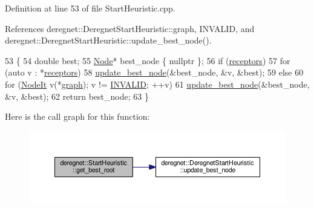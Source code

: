 Definition at line 53 of file Start\+Heuristic.\+cpp.



References deregnet\+::\+Deregnet\+Start\+Heuristic\+::graph, I\+N\+V\+A\+L\+ID, and deregnet\+::\+Deregnet\+Start\+Heuristic\+::update\+\_\+best\+\_\+node().


\begin{DoxyCode}
53                                     \{
54     \textcolor{keywordtype}{double} best;
55     \hyperlink{namespacederegnet_a744bad34f2de9856d36715a445f027f3}{Node}* best\_node \{ \textcolor{keyword}{nullptr} \};
56     \textcolor{keywordflow}{if} (\hyperlink{classderegnet_1_1DeregnetStartHeuristic_ab80c046ff2b7c64086fceb84987b3e50}{receptors})
57         \textcolor{keywordflow}{for} (\textcolor{keyword}{auto} v : *\hyperlink{classderegnet_1_1DeregnetStartHeuristic_ab80c046ff2b7c64086fceb84987b3e50}{receptors})
58             \hyperlink{classderegnet_1_1DeregnetStartHeuristic_a50179ff9db4d416b93ff41d1dcee1358}{update\_best\_node}(&best\_node, &v, &best);
59     \textcolor{keywordflow}{else}
60         \textcolor{keywordflow}{for} (\hyperlink{namespacederegnet_ac34314e1b5f456fc6d1bb9d96316de4a}{NodeIt} v(*\hyperlink{classderegnet_1_1DeregnetStartHeuristic_a4da8e53fc7c0fa3dbe0e3ef07296d75e}{graph}); v != \hyperlink{usinglemon_8h_adf770fe2eec438e3758ffe905dbae208}{INVALID}; ++v)
61             \hyperlink{classderegnet_1_1DeregnetStartHeuristic_a50179ff9db4d416b93ff41d1dcee1358}{update\_best\_node}(&best\_node, &v, &best);
62     \textcolor{keywordflow}{return} best\_node;
63 \}
\end{DoxyCode}


Here is the call graph for this function\+:\nopagebreak
\begin{figure}[H]
\begin{center}
\leavevmode
\includegraphics[width=350pt]{classderegnet_1_1StartHeuristic_a84ed02caf211e22b663e4e3c0d5b4f24_cgraph}
\end{center}
\end{figure}


